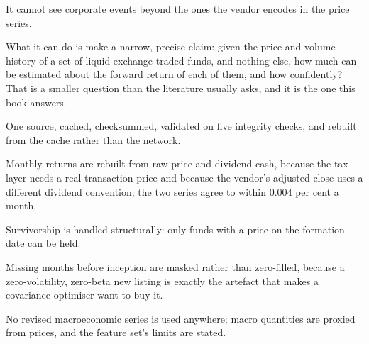 It cannot see corporate events beyond the ones the vendor encodes in the
price series.

What it can do is make a narrow, precise claim: given the price and volume
history of a set of liquid exchange-traded funds, and nothing else, how
much can be estimated about the forward return of each of them, and how
confidently? That is a smaller question than the literature usually asks,
and it is the one this book answers.

\begin{keytakeaways}
\item One source, cached, checksummed, validated on five integrity checks,
and rebuilt from the cache rather than the network.
\item Monthly returns are rebuilt from raw price and dividend cash, because
the tax layer needs a real transaction price and because the vendor's
adjusted close uses a different dividend convention; the two series agree
to within 0.004 per cent a month.
\item Survivorship is handled structurally: only funds with a price on the
formation date can be held.
\item Missing months before inception are masked rather than zero-filled,
because a zero-volatility, zero-beta new listing is exactly the artefact
that makes a covariance optimiser want to buy it.
\item No revised macroeconomic series is used anywhere; macro quantities
are proxied from prices, and the feature set's limits are stated.
\end{keytakeaways}
